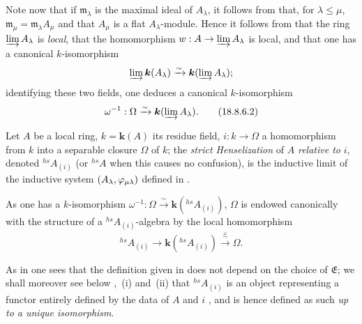 \begin{env}[18.8.6]
Note now that if $\mathfrak{m}_\lambda$ is the maximal ideal of $A_\lambda$, it follows from  that, for $\lambda\leq\mu$, $\mathfrak{m}_\mu=\mathfrak{m}_\lambda A_\mu$ and that $A_\mu$ is a flat $A_\lambda$-module.
Hence it follows from  that the ring $\varinjlim A_\lambda$ is \emph{local}, that the homomorphism $w:A\to\varinjlim A_\lambda$ is local, and that one has a canonical $k$-isomorphism
\[
  \varinjlim\boldsymbol{k}(A_\lambda)\xrightarrow{\sim}\boldsymbol{k}(\varinjlim A_\lambda);
\]
identifying these two fields, one deduces a canonical $k$-isomorphism
\begin{equation}
  \omega^{-1}:\Omega\xrightarrow{\sim}\boldsymbol{k}(\varinjlim A_\lambda).
  \label{IV.18.8.6.2}
\tag{18.8.6.2}
\end{equation}
\end{env}

\begin{definition}[18.8.7]
\label{IV.18.8.7}
Let $A$ be a local ring, $k=\boldsymbol{k}(A)$ its residue field, $i:k\to\Omega$ a homomorphism from $k$ into a separable closure $\Omega$ of $k$;
the \emph{strict Henselization} of $A$ \emph{relative to} $i$, denoted ${}^{hs}\!A_{(i)}$ (or ${}^{hs}\!A$ when this causes no confusion), is the inductive limit of the inductive system $(A_\lambda,\varphi_{\mu\lambda})$ defined in .
\end{definition}

As one has a $k$-isomorphism $\omega^{-1}:\Omega\xrightarrow{\sim}\boldsymbol{k}({}^{hs}\!A_{(i)})$, $\Omega$ is endowed canonically with the structure of a ${}^{hs}\!A_{(i)}$-algebra by the local homomorphism
\[
  {}^{hs}\!A_{(i)}\to\boldsymbol{k}({}^{hs}\!A_{(i)})\xrightarrow{\overset{\omega}{\sim}}\Omega.
\]

As in  one sees that the definition given in  does not depend on the choice of $\mathfrak{E}$;
we shall moreover see below ,~(i) and~(ii) that ${}^{hs}\!A_{(i)}$ is an object representing a functor entirely defined by the data of $A$ and $i$ , and is hence defined as such \emph{up to a unique isomorphism}.

